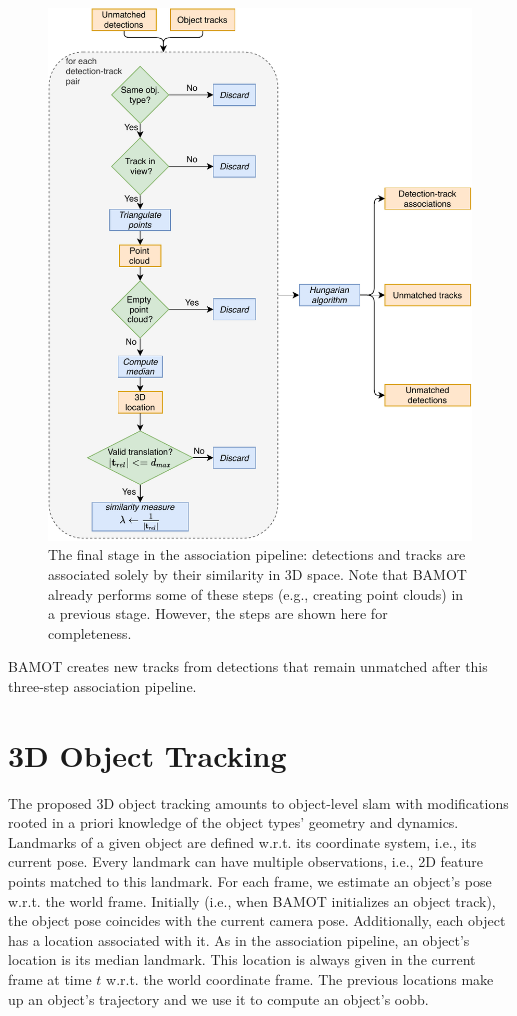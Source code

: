 \documentclass[headsepline, hidelinks, footsepline, footinclude=false, oneside, fontsize=11pt, paper=a4, listof=totoc, bibliography=totoc]{scrbook}
\begin{document}
\begin{figure}[htbp]
\centering
\includegraphics[width=.9\linewidth]{figures/match_detections_tracks_3d.pdf}
\caption{\label{fig:3d-assoc-flow}The final stage in the association pipeline: detections and tracks are associated solely by their similarity in 3D space. Note that BAMOT already performs some of these steps (e.g., creating point clouds) in a previous stage. However, the steps are shown here for completeness.}
\end{figure}

BAMOT creates new tracks from detections that remain unmatched after this three-step association pipeline.

\section{3D Object Tracking \label{3d-ot}}
\label{sec:org2b8c4a1}
   The proposed 3D object tracking amounts to object-level \gls{slam} with modifications rooted in a priori knowledge of the object types' geometry and dynamics.
Landmarks of a given object are defined w.r.t. its coordinate system, i.e., its current pose. Every landmark can have multiple observations, i.e., 2D feature points matched to this landmark. 
For each frame, we estimate an object's pose w.r.t. the world frame.
Initially (i.e., when BAMOT initializes an object track), the object pose coincides with the current camera pose. 
Additionally, each object has a location associated with it.
As in the association pipeline, an object's location is its median landmark. This location is always given in the current frame at time \(t\) w.r.t. the world coordinate frame.
The previous locations make up an object's trajectory and we use it to compute an object's \gls{oobb}. 
\end{document}
